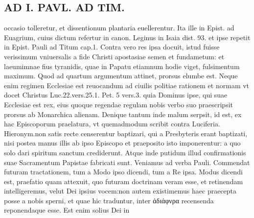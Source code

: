 \documentclass{article}
\begin{document}
\begin{pages}
\section*{AD I. PAVL. AD TIM. }
\marginpar{[ p.98 ]}\pstart occasio tolleretur, et dissentionum plantaria euellerentur. Ita ille in Epist. ad Euagrium, cuius dictum refertur in canon. Leginus in Isaia dist. 93. et ipse repetit in Epist. Pauli ad Titum cap.1. Contra vero res ipsa docuit, istud fuisse verissimum vniuersalis a fide Christi apostasiae semen et fundametum: et laeumimnae fius tyranidis, quae in Papatu etiamnum hodie viget, fulsimentum maximum.  \pend\pstart Quod ad quartum argumentum attinet, prorsus elumbe est. Neque enim regimen Ecclesiae est reuocandum ad ciuilis politiae rationem et normam vt docet Christus Luc.22.vers.25.1. Pet. 5 vers.3. quia Dominus ipse, qui suae Ecclesiae est rex, eius quoque regendae regulam nobis verbo suo praescripsit prorsus ab Monarchica alienam. Denique tantum inde malum serpsit, id est, ex hac Episcoporum praelatura, vt quemadmodum scribit contra Luciferia. Hieronym.non satis recte censerentur baptizari, qui a Presbyteris erant baptizati, nisi postea manus illis ab ipso Episcopo et praeposito isto imponerentur: a quo solo dari spiritum sanctum crediderunt. Atque inde putidum illud confirmationis suae Sacramentum Papistae fabricati sunt.  \pend\pstart Veniamus ad verba Pauli. Commendat futuram tractationem, tum a Modo ipso dicendi, tum a Re ipsa. Modus dicendi est, praefatio quam attexuit, quo futuram doctrinam veram esse, et retinendam intelligeremus, velut Dei ipsius vocem:non autem existimemus haec praecepta posse a nobis sperni, et quae hic traduntur, inter ἀδιάφνρα recensenda reponendaque esse. Est enim solius Dei in  \pend

\end{pages}
\end{document}
